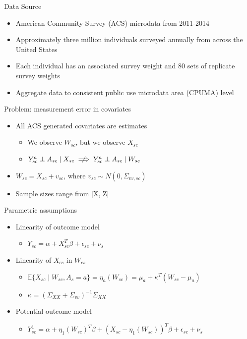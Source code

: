 \documentclass[hyperref={pdfpagelabels=false}]{beamer}
\begin{document}
\begin{frame}{Data Source}
    \begin{itemize}
    \item American Community Survey (ACS) microdata from 2011-2014 \bigskip 
    \item Approximately three million individuals surveyed annually from across the United States \bigskip 
    \item Each individual has an associated survey weight and 80 sets of replicate survey weights \bigskip 
    \item Aggregate data to consistent public use microdata area (CPUMA) level
    \end{itemize}
\end{frame}   

\begin{frame}{Problem: measurement error in covariates}
    \begin{itemize}
        \item All ACS generated covariates are estimates \bigskip
        \begin{itemize}
            \item We observe $W_{sc}$, but we observe $X_{sc}$ \bigskip
            \item $Y_{sc}^a \perp A_{sc} \mid X_{sc} \centernot\implies Y_{sc}^a \perp A_{sc} \mid W_{sc}$ \bigskip
        \end{itemize}
        \item $W_{sc} = X_{sc} + v_{sc}$, where $v_{sc} \sim N(0, \Sigma_{vv, sc})$ \bigskip
        \item Sample sizes range from [X, Z] \bigskip
    \end{itemize}
\end{frame}

\begin{frame}{Parametric assumptions}
    \begin{itemize}
        \item Linearity of outcome model \bigskip
        \begin{itemize}
            \item $Y_{sc} = \alpha + X_{sc}^T\beta + \epsilon_{sc} + \nu_s$ \bigskip
        \end{itemize}
        \item Linearity of $X_{cs}$ in $W_{cs}$ \bigskip 
        \begin{itemize}
            \item $\mathbb{E}\{X_{sc} \mid W_{sc}, A_s = a\} = \eta_a(W_{sc}) = \mu_a + \kappa^T(W_{sc} - \mu_a)$ \bigskip
            \item $\kappa = (\Sigma_{XX} + \Sigma_{vv})^{-1}\Sigma_{XX}$ \bigskip
        \end{itemize}
        \item Potential outcome model \bigskip
        \begin{itemize}
            \item $Y_{sc}^1 = \alpha + \eta_1(W_{sc})^T\beta + (X_{sc} - \eta_1(W_{sc}))^T\beta + \epsilon_{sc} + \nu_{s}$
        \end{itemize}
    \end{itemize}
\end{frame}
\end{document}
